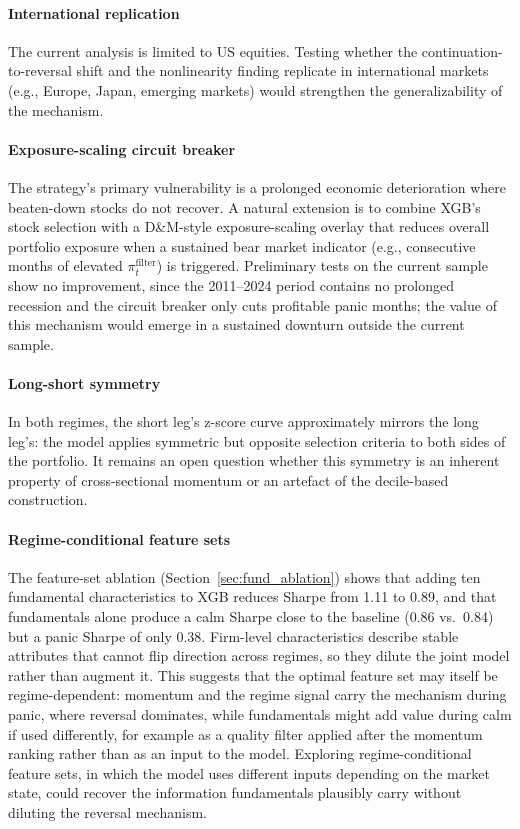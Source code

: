 \paragraph{International replication}
The current analysis is limited to US equities. Testing whether the continuation-to-reversal shift and the nonlinearity finding replicate in international markets (e.g., Europe, Japan, emerging markets) would strengthen the generalizability of the mechanism.

\paragraph{Exposure-scaling circuit breaker}
The strategy's primary vulnerability is a prolonged economic deterioration where beaten-down stocks do not recover. A natural extension is to combine XGB's stock selection with a D\&M-style exposure-scaling overlay that reduces overall portfolio exposure when a sustained bear market indicator (e.g., consecutive months of elevated $\pi_t^{\text{filter}}$) is triggered. Preliminary tests on the current sample show no improvement, since the 2011--2024 period contains no prolonged recession and the circuit breaker only cuts profitable panic months; the value of this mechanism would emerge in a sustained downturn outside the current sample.

\paragraph{Long-short symmetry}
In both regimes, the short leg's z-score curve approximately mirrors the long leg's: the model applies symmetric but opposite selection criteria to both sides of the portfolio. It remains an open question whether this symmetry is an inherent property of cross-sectional momentum or an artefact of the decile-based construction.

\paragraph{Regime-conditional feature sets}
The feature-set ablation (Section~\ref{sec:fund_ablation}) shows that adding ten fundamental characteristics to XGB reduces Sharpe from 1.11 to 0.89, and that fundamentals alone produce a calm Sharpe close to the baseline (0.86 vs.\ 0.84) but a panic Sharpe of only 0.38. Firm-level characteristics describe stable attributes that cannot flip direction across regimes, so they dilute the joint model rather than augment it. This suggests that the optimal feature set may itself be regime-dependent: momentum and the regime signal carry the mechanism during panic, where reversal dominates, while fundamentals might add value during calm if used differently, for example as a quality filter applied after the momentum ranking rather than as an input to the model. Exploring regime-conditional feature sets, in which the model uses different inputs depending on the market state, could recover the information fundamentals plausibly carry without diluting the reversal mechanism.

